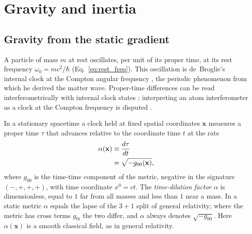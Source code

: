 \documentclass[aps,prd,onecolumn,tightenlines,nofootinbib,notitlepage,11pt,floatfix]{revtex4-2}
\theoremstyle{indentedtheorem}
\begin{document}
\section{Gravity and inertia}
\label{sec:grav_inertia}

\subsection{Gravity from the static gradient}
\label{sec:gravity}

A particle of mass $m$ at rest oscillates, per unit of its proper time, at its rest frequency $\omega_0=mc^2/\hbar$ (Eq.~\eqref{eq:rest_freq}). This oscillation is de~Broglie's internal clock at the Compton angular frequency \citep{Compton1923Quantum,deBroglie1925Thesis}, the periodic phenomenon from which he derived the matter wave. Proper-time differences can be read interferometrically with internal clock states \citep{Zych2011Quantum}; interpreting an atom interferometer as a clock at the Compton frequency is disputed \citep{Lan2013Clock,Wolf2011,SinhaSamuel2011}.

In a stationary spacetime a clock held at fixed spatial coordinates $\mathbf{x}$ measures a proper time $\tau$ that advances relative to the coordinate time $t$ at the rate \citep{Einstein1915GR,MTW1973Gravitation}
\begin{align}
    \alpha(\mathbf{x}) &\equiv \frac{d\tau}{dt} \notag\\
                       &= \sqrt{-g_{00}(\mathbf{x})} ,
    \label{eq:alpha_def}
\end{align}
where $g_{00}$ is the time-time component of the metric, negative in the signature $(-,+,+,+)$, with time coordinate $x^0=ct$. The \emph{time-dilation factor} $\alpha$ is dimensionless, equal to $1$ far from all masses and less than $1$ near a mass. In a static metric $\alpha$ equals the lapse of the $3+1$ split of general relativity; where the metric has cross terms $g_{0i}$ the two differ, and $\alpha$ always denotes $\sqrt{-g_{00}}$. Here $\alpha(\mathbf{x})$ is a smooth classical field, as in general relativity.
\end{document}
